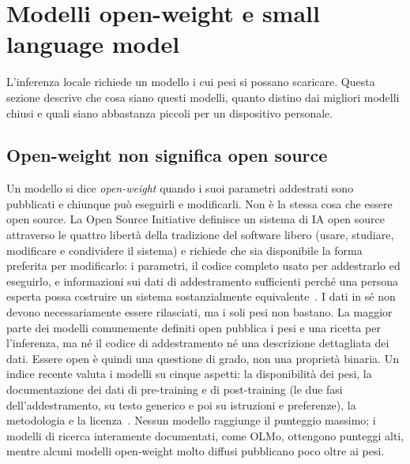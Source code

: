 \section{Modelli open-weight e small language model}
\label{sec:local-models}

L'inferenza locale richiede un modello i cui pesi si possano scaricare. Questa sezione descrive che cosa siano questi
modelli, quanto distino dai migliori modelli chiusi e quali siano abbastanza piccoli per un dispositivo personale.

\subsection{Open-weight non significa open source}
\label{sec:local-openweight}

Un modello si dice \emph{open-weight} quando i suoi parametri addestrati sono pubblicati e chiunque può eseguirli e
modificarli. Non è la stessa cosa che essere open source. La Open Source Initiative definisce un sistema di IA open source
attraverso le quattro libertà della tradizione del software libero (usare, studiare, modificare e condividere il sistema)
e richiede che sia disponibile la forma preferita per modificarlo: i parametri, il codice completo usato per addestrarlo
ed eseguirlo, e informazioni sui dati di addestramento sufficienti perché una persona esperta possa costruire un sistema
sostanzialmente equivalente~\cite{osi2024osaid}. I dati in sé non devono necessariamente essere rilasciati, ma i soli
pesi non bastano. La maggior parte dei modelli comunemente definiti open pubblica i pesi e una ricetta per l'inferenza,
ma né il codice di addestramento né una descrizione dettagliata dei dati. Essere open è quindi una questione di grado, non una
proprietà binaria. Un indice recente valuta i modelli su cinque aspetti: la disponibilità dei pesi, la documentazione
dei dati di pre-training e di post-training (le due fasi dell'addestramento, su testo generico e poi su istruzioni e
preferenze), la metodologia e la licenza~\cite{aa2025openness}. Nessun modello raggiunge il punteggio massimo; i modelli
di ricerca interamente documentati, come OLMo, ottengono punteggi alti, mentre alcuni modelli open-weight molto diffusi
pubblicano poco oltre ai pesi.

